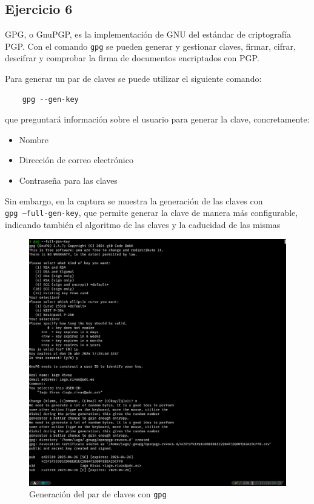 \subsection{Ejercicio 6}
\graphicspath{ {img/06} }

GPG, o GnuPGP, es la implementación de GNU del estándar de criptografía PGP. Con el comando \texttt{gpg} se pueden generar y gestionar claves, firmar, cifrar, descifrar y comprobar la firma de documentos encriptados con PGP.

Para generar un par de claves se puede utilizar el siguiente comando:
\begin{verbatim}
    gpg --gen-key
\end{verbatim}

que preguntará información sobre el usuario para generar la clave, concretamente:
\begin{itemize}
    \item{Nombre}
    \item{Dirección de correo electrónico}
    \item{Contraseña para las claves}
\end{itemize}

Sin embargo, en la captura se muestra la generación de las claves con \\ \texttt{gpg --full-gen-key}, que permite generar la clave de manera más configurable, indicando también el algoritmo de las claves y la caducidad de las mismas

\begin{figure}[H]
    \centering
    \includegraphics[width=\textwidth]{gpg-genkey.png}
    \caption{Generación del par de claves con \texttt{gpg}}
\end{figure}

